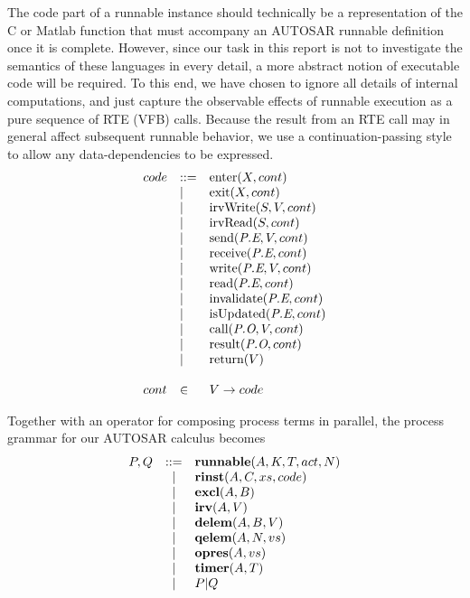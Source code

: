 \documentclass[twocolumn]{article}
\begin{document}
The code part of a runnable instance should technically be a representation of the C or Matlab function that must accompany an AUTOSAR runnable definition once it is complete. However, since our task in this report is not to investigate the semantics of these languages in every detail, a more abstract notion of executable code will be required. To this end, we have chosen to ignore all details of internal computations, and just capture the observable effects of runnable execution as a pure sequence of RTE (VFB) calls. Because the result from an RTE call may in general affect subsequent runnable behavior, we use a continuation-passing style to allow any data-dependencies to be expressed.
%
\[
\begin{array}{lll}
  \Code & ::= & \Enter{X}{\Cont}                \\
        & |   & \Exit{X}{\Cont}                 \\
        & |   & \IrvWrite{S}{V}{\Cont}          \\
        & |   & \IrvRead{S}{\Cont}              \\
        & |   & \Send{\Te{E}{P}}{V}{\Cont}      \\
        & |   & \Receive{\Te{E}{P}}{\Cont}      \\
        & |   & \Write{\Te{E}{P}}{V}{\Cont}     \\
        & |   & \Read{\Te{E}{P}}{\Cont}         \\
        & |   & \Invalidate{\Te{E}{P}}{\Cont}   \\
        & |   & \IsUpdated{\Te{E}{P}}{\Cont}    \\
        & |   & \Call{\To{O}{P}}{V}{\Cont}      \\
        & |   & \Result{\To{O}{P}}{\Cont}       \\
        & |   & \Return{V}                      \\
\\
  \Cont & \in & V \rightarrow \Code             \\
\end{array}
\]

Together with an operator for composing process terms in parallel, the process grammar for our AUTOSAR calculus becomes
\[
\begin{array}{rcll}
  P,Q   & ::= & \Trunnable{A}{K}{T}{\Act}{N}    \\
        & |   & \Trinst{A}{C}{\Xs}{\Code}       \\
        & |   & \Texcl{A}{B}                    \\
        & |   & \Tirv{A}{V}                     \\
        & |   & \Tdelem{A}{B}{V}                \\
        & |   & \Tqelem{A}{N}{\Vs}              \\
        & |   & \Topres{A}{\Vs}                 \\
        & |   & \Ttimer{A}{T}                   \\
        & |   & P|Q                             \\
\end{array}
\]
\end{document}
